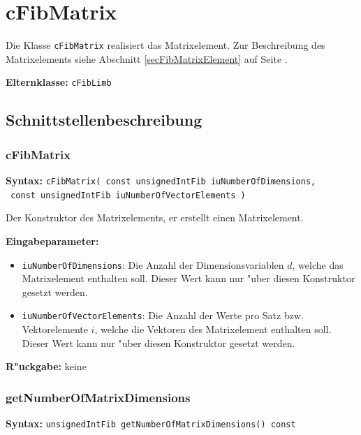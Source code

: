 \section{cFibMatrix}
\label{secCFibMatrix}\label{secCFibMatrixElement}

Die Klasse \verb|cFibMatrix| realisiert das Matrixelement.
Zur Beschreibung des Matrixelements siehe Abschnitt \ref{secFibMatrixElement} auf Seite \pageref{secFibMatrixElement} .

\bigskip\noindent
\textbf{Elternklasse:} \verb|cFibLimb|


\subsection{Schnittstellenbeschreibung}

\subsubsection{cFibMatrix}

\textbf{Syntax:} \verb|cFibMatrix( const unsignedIntFib iuNumberOfDimensions,| \\\verb| const unsignedIntFib iuNumberOfVectorElements )|

\bigskip\noindent
Der Konstruktor des Matrixelements, er erstellt einen Matrixelement.

\bigskip\noindent
\textbf{Eingabeparameter:}
\begin{itemize}
 \item \verb|iuNumberOfDimensions|: Die Anzahl der Dimensionsvariablen $d$, welche das Matrixelement enthalten soll. Dieser Wert kann nur "uber diesen Konstruktor gesetzt werden.
 \item \verb|iuNumberOfVectorElements|: Die Anzahl der Werte pro Satz bzw. Vektorelemente $i$, welche die Vektoren des Matrixelement enthalten soll. Dieser Wert kann nur "uber diesen Konstruktor gesetzt werden.
\end{itemize}

\bigskip\noindent
\textbf{R"uckgabe:} keine


\subsubsection{getNumberOfMatrixDimensions}

\textbf{Syntax:} \verb|unsignedIntFib getNumberOfMatrixDimensions() const|

